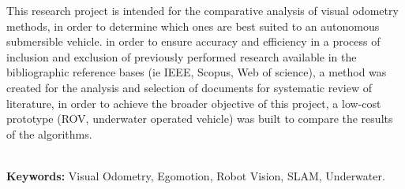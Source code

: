 \begin{thesisabastract}

This research project is intended for the comparative analysis of visual odometry methods, in order to determine which ones are best suited to an autonomous submersible vehicle. in order to ensure accuracy and efficiency in a process of inclusion and exclusion of previously performed research available in the bibliographic reference bases (ie IEEE, Scopus, Web of science), a method was created for the analysis and selection of documents for systematic review of literature, in order to achieve the broader objective of this project, a low-cost prototype (ROV, underwater operated vehicle) was built to compare the results of the algorithms.

\ \\
\textbf{Keywords:} Visual Odometry, Egomotion, Robot Vision, SLAM, Underwater.
\ \\

\end{thesisabastract}
